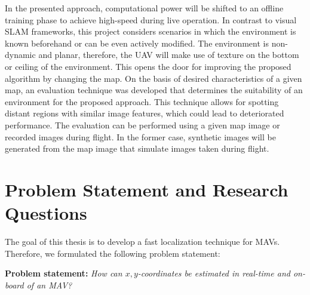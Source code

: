 \documentclass[11pt]{report}
\begin{document}
In the presented approach, computational power will be shifted to an
offline training phase to achieve high-speed during live operation. In
contrast to visual SLAM frameworks, this project considers scenarios
in which the environment is known beforehand or can be even actively
modified. The environment is non-dynamic and planar, therefore, the
UAV will make use of texture on the bottom or ceiling of the
environment. This opens the door for improving the proposed algorithm
by changing the map. On the basis of desired characteristics of a
given map, an evaluation technique was developed that determines the
suitability of an environment for the proposed approach. This
technique allows for spotting distant regions with similar image
features, which could lead to deteriorated performance. The evaluation
can be performed using a given map image or recorded images during
flight. In the former case, synthetic images will be generated from
the map image that simulate images taken during flight.


\section{Problem Statement and Research Questions}
\label{sec:researchquestions}

The goal of this thesis is to develop a fast localization technique
for MAVs. Therefore, we formulated the following problem statement:

\par
\begingroup
\leftskip=0.7cm %
\noindent \textbf{Problem statement:} \emph{How can
    $x,y$-coordinates be estimated in real-time and on-board of an
    MAV?} %
\par
\endgroup
\end{document}
